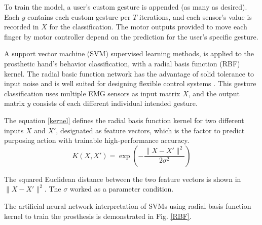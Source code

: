 To train the model, a user's custom gesture is appended (as many as
desired). Each $y$ contains each custom gesture per $T$ iterations,
and each sensor's value is recorded in $X$ for the classification.
The motor outputs provided to move each finger by motor controller
depend on the prediction for the user's specific gesture.

A support vector machine (SVM) \cite{ML1}\cite{ML2} supervised
learning methods, is applied to the prosthetic hand's behavior
classification, with a radial basis function (RBF) kernel. The radial
basic function network has the advantage of solid tolerance to input
noise and is well suited for designing flexible control systems
\cite{RBFAdv}. This gesture classification uses multiple EMG sensors
as input matrix $X$, and the output matrix $y$ consists of each
different individual intended gesture.

The equation \eqref{kernel} defines the radial basis function kernel
for two different inputs $X$ and $X'$, designated as feature vectors,
which is the factor to predict purposing action with trainable
high-performance accuracy.
\begin{equation}
K(X,X') = \exp(-\frac{\lVert X - X' \rVert^2}{2\sigma^2})
\label{kernel}
\end{equation}

The squared Euclidean distance between the two feature vectors is
shown in $\lVert X - X' \rVert^2$.  The $\sigma$ worked as a parameter
condition.


The artificial neural network interpretation of SVMs using radial basis function kernel to train the prosthesis is demonstrated in Fig. \ref{RBF}.

